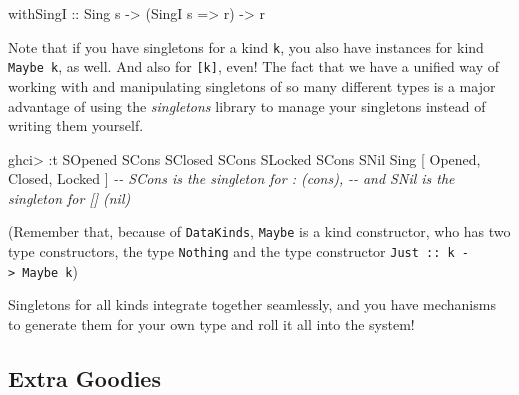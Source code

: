 \documentclass[]{article}
\newenvironment{Shaded}{}{}
\newcommand{\CommentTok}[1]{\textcolor[rgb]{0.38,0.63,0.69}{\textit{#1}}}
\newcommand{\DataTypeTok}[1]{\textcolor[rgb]{0.56,0.13,0.00}{#1}}
\newcommand{\NormalTok}[1]{#1}
\newcommand{\OperatorTok}[1]{\textcolor[rgb]{0.40,0.40,0.40}{#1}}
\newcommand{\OtherTok}[1]{\textcolor[rgb]{0.00,0.44,0.13}{#1}}
\begin{document}
\begin{Shaded}
\begin{Highlighting}[]
\OtherTok{withSingI ::} \DataTypeTok{Sing}\NormalTok{ s }\OtherTok{{-}\textgreater{}}\NormalTok{ (}\DataTypeTok{SingI}\NormalTok{ s }\OtherTok{=\textgreater{}}\NormalTok{ r) }\OtherTok{{-}\textgreater{}}\NormalTok{ r}
\end{Highlighting}
\end{Shaded}

Note that if you have singletons for a kind \texttt{k}, you also have instances
for kind \texttt{Maybe\ k}, as well. And also for \texttt{{[}k{]}}, even! The
fact that we have a unified way of working with and manipulating singletons of
so many different types is a major advantage of using the \emph{singletons}
library to manage your singletons instead of writing them yourself.

\begin{Shaded}
\begin{Highlighting}[]
\NormalTok{ghci}\OperatorTok{\textgreater{}} \OperatorTok{:}\NormalTok{t }\DataTypeTok{SOpened} \OtherTok{\textasciigrave{}SCons\textasciigrave{}} \DataTypeTok{SClosed} \OtherTok{\textasciigrave{}SCons\textasciigrave{}} \DataTypeTok{SLocked} \OtherTok{\textasciigrave{}SCons\textasciigrave{}} \DataTypeTok{SNil}
\DataTypeTok{Sing}\NormalTok{ \textquotesingle{}[ }\DataTypeTok{\textquotesingle{}Opened}\NormalTok{, }\DataTypeTok{\textquotesingle{}Closed}\NormalTok{, }\DataTypeTok{\textquotesingle{}Locked}\NormalTok{ ]}
\CommentTok{{-}{-} \textquotesingle{}SCons is the singleton for \textasciigrave{}:\textasciigrave{} (cons),}
\CommentTok{{-}{-} and \textquotesingle{}SNil is the singleton for \textasciigrave{}[]\textasciigrave{} (nil)}
\end{Highlighting}
\end{Shaded}

(Remember that, because of \texttt{DataKinds}, \texttt{Maybe} is a kind
constructor, who has two type constructors, the type
\texttt{\textquotesingle{}Nothing} and the type constructor
\texttt{\textquotesingle{}Just\ ::\ k\ -\textgreater{}\ Maybe\ k})

Singletons for all kinds integrate together seamlessly, and you have mechanisms
to generate them for your own type and roll it all into the system!

\subsection{Extra Goodies}\label{extra-goodies}
\end{document}
